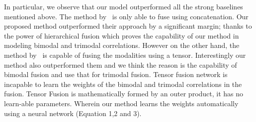 \documentclass[review]{elsarticle}
\newcommand\?[1]{\hl{#1}}
\begin{document}
In particular, we observe that our model outperformed all the strong baselines mentioned above. The method by~\citep{pordee} is only able to fuse using concatenation. Our proposed method outperformed their approach by a significant margin; thanks to the power of hierarchical fusion which proves the capability of our method in modeling bimodal and trimodal correlations. However on the other hand, the method by~\citep{zadten} is capable of fusing the modalities using a tensor. Interestingly our method also outperformed them and we think the reason is the capability of bimodal fusion and use that for trimodal fusion. Tensor fusion network is incapable to learn the weights of the bimodal and trimodal correlations in the fusion. Tensor Fusion is mathematically formed by an outer product, it
has no learn-able parameters. Wherein our method learns the weights automatically using a neural network (Equation 1,2 and 3).

\begin{table*}[t]
    \centering
        \caption{Comparison of Context-Aware Hierarchical Fusion (CHFusion) in terms of accuracy () and f-score (for IEMOCAP: ) with the state of the art for CMU-MOSI
          and IEMOCAP dataset; bold font signifies best accuracy for the corresponding dataset and
          modality or modalities, where T stands text, V for video, A for audio.  = Poria et al.~\citep{pordee},  = Zadeh et al.~\citep{zadten}.  and  are the accuracy and f-score of CHFusion respectively.}
    \label{table:chfusion}
\end{table*}
\end{document}
